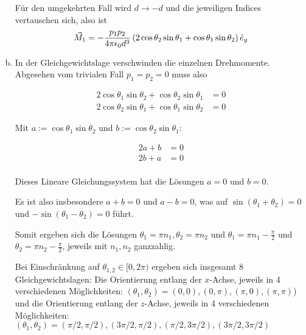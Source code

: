 \documentclass[a4paper,german,12pt,smallheadings]{scrartcl}
\begin{document}
\begin{enumerate}[a)]
    Für den umgekehrten Fall wird $d \to -d$ und die jeweiligen Indices
    vertauschen sich, also ist
    \begin{equation}
      \vec{M}_{1} = -\frac{p_1p_2}{4 \pi \epsilon_0 d^3} \del{
        2 \cos \theta_2 \sin \theta_1 + \cos \theta_1 \sin \theta_2
      } \hat{e}_y
    \end{equation}
  \item
    In der Gleichgewichtslage verschwinden die einzelnen Drehmomente. Abgesehen
    vom trivialen Fall $p_1 = p_2 = 0$ muss also

    \begin{align}
      2 \cos \theta_1 \sin \theta_2 + \cos \theta_2 \sin \theta_1 &= 0 \\
      2 \cos \theta_2 \sin \theta_1 + \cos \theta_1 \sin \theta_2 &= 0
    \end{align}

    Mit $a := \cos \theta_1 \sin \theta_2$ und $b := \cos \theta_2 \sin \theta_1$:

    \begin{align}
      2 a + b &= 0 \\
      2 b + a &= 0 \\
    \end{align}

    Dieses Lineare Gleichungssystem hat die Lösungen $a = 0$ und $b = 0$.

    Es ist also insbesondere $a + b = 0$ und $a - b = 0$, was auf
    $\sin(\theta_1 + \theta_2) = 0$ und $-\sin(\theta_1 - \theta_2) = 0$ führt.

    Somit ergeben sich die Lösungen $\theta_1 = \pi n_1, \theta_2 = \pi n_2$
    und $\theta_1 = \pi n_1 - \frac{\pi}{2}$ und $\theta_2 = \pi n_2 -
    \frac{\pi}{2}$, jeweils mit $n_1, n_2$ ganzzahlig.

    Bei Einschränkung auf $\theta_{1,2} \in [0, 2\pi)$ ergeben sich insgesamt 8
    Gleichgewichtslagen: Die Orientierung entlang der $x$-Achse, jeweils in 4
    verschiedenen Möglichkeiten: $(\theta_1, \theta_2) = (0, 0), (0, \pi),
    (\pi, 0), (\pi, \pi)$) und die Orientierung entlang der $z$-Achse,
    jeweils in 4 verschiedenen Möglichkeiten: $(\theta_1, \theta_2) = (\pi/2,
    \pi/2), (3 \pi/2, \pi/2), (\pi/2, 3 \pi/2), (3 \pi/2, 3\pi/2)$


\end{enumerate}
\end{document}
